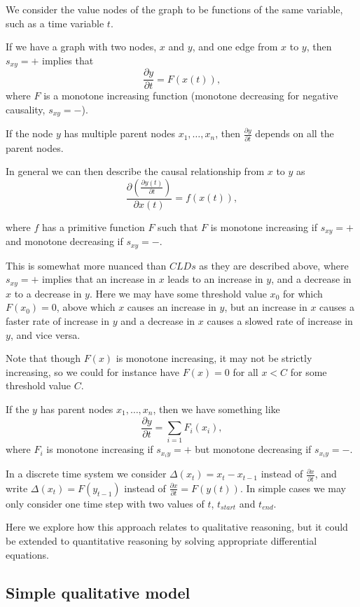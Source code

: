 \documentclass[a4paper,11pt]{article}
\begin{document}
We consider the value nodes of the graph to be functions of the same
variable, such as a time variable $t$.

If we have a graph with two nodes, $x$ and $y$, and one edge from $x$
to $y$, then $s_{xy}=+$ implies that
\[\frac{\partial y}{\partial t} = F(x(t)),\]
where $F$ is a monotone increasing function (monotone decreasing for negative
causality, $s_{xy}=-$).

If the node $y$ has multiple parent nodes $x_1,\ldots,x_n$, then
$\frac{\partial y}{\partial t}$ depends on all the parent nodes.

In general we can then describe the causal relationship from $x$ to
$y$ as
\[\frac{\partial\left( \frac{\partial y(t)}{\partial t} \right)}{\partial x(t)} =
  f(x(t)),\]

where $f$ has a primitive function $F$ such that $F$ is monotone
increasing if $s_{xy}=+$ and monotone decreasing if $s_{xy}= -$.

This is somewhat more nuanced than $CLDs$ as they are described above,
where $s_{xy}=+$ implies that an increase in $x$ leads to an increase
in $y$, and a decrease in $x$ to a decrease in $y$.
%
Here we may have some threshold value $x_0$ for which $F(x_0) = 0$,
above which $x$ causes an increase in $y$, but an increase in $x$
causes a faster rate of increase in $y$ and a decrease in $x$ causes a
slowed rate of increase in $y$, and vice versa.

Note that though $F(x)$ is monotone increasing, it may not be strictly
increasing, so we could for instance have $F(x) = 0$ for all $x < C$
for some threshold value $C$.

If the $y$ has parent nodes $x_1,\ldots,x_n$, then we have something
like
\[\frac{\partial y}{\partial t} = \sum_{i=1}F_i(x_i),\]
where $F_i$ is monotone increasing if $s_{x_iy}=+$ but monotone
decreasing if $s_{x_iy}=-$.

In a discrete time system we consider $\Delta(x_t) = x_t - x_{t-1}$
instead of $\frac{\partial x}{\partial t}$, and write
$\Delta(x_t) = F(y_{t-1})$ instead of
$\frac{\partial x}{\partial t} = F(y(t))$.
%
In simple cases we may only consider one time step with two values of
$t$, $t_{start}$ and $t_{end}$.

Here we explore how this approach relates to qualitative reasoning,
but it could be extended to quantitative reasoning by solving
appropriate differential equations.

\subsection{Simple qualitative model}
\end{document}

